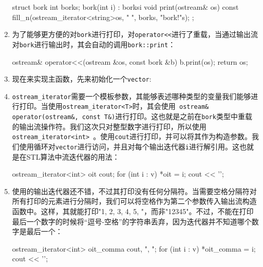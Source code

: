 \begin{enumerate}
\begin{codebox}[cpp]
struct bork {
    int borks;
    bork(int i) : borks{i} {}
    void print(ostream& os) const {
        fill_n(ostream_iterator<string>{os, " "},
               borks, "bork!"s);
    }
};
\end{codebox}

\item 为了能够更方便的对\texttt{bork}进行打印，对\texttt{operator<<}进行了重载，当通过输出流对\texttt{bork}进行输出时，其会自动的调用\texttt{bork::print}：

\begin{codebox}[cpp]
ostream& operator<<(ostream &os, const bork &b) {
    b.print(os);
    return os;
}
\end{codebox}

\item 现在来实现主函数，先来初始化一个\texttt{vector}:

\begin{codebox}[cpp]
int main()
{
    const vector<int> v {1, 2, 3, 4, 5};
\end{codebox}

\item \texttt{ostream\_iterator}需要一个模板参数，其能够表述哪种类型的变量我们能够进行打印。当使用\texttt{ostream\_iterator<T>}时，其会使用\texttt{ ostream\& operator(ostream\&, const T\&)}进行打印。这也就是之前在\texttt{bork}类型中重载的输出流操作符。我们这次只对整型数字进行打印，所以使用\texttt{ostream\_iterator<int> }。使用\texttt{cout}进行打印，并可以将其作为构造参数。我们使用循环对\texttt{vector}进行访问，并且对每个输出迭代器\texttt{i}进行解引用。这也就是在STL算法中流迭代器的用法：

\begin{codebox}[cpp]
    ostream_iterator<int> oit {cout};
    for (int i : v) { *oit = i; }
    cout << '\n';
\end{codebox}

\item 使用的输出迭代器还不错，不过其打印没有任何分隔符。当需要空格分隔符对所有打印的元素进行分隔时，我们可以将空格作为第二个参数传入输出流构造函数中。这样，其就能打印"1, 2, 3, 4, 5, "，而非"12345"。不过，不能在打印最后一个数字的时候将“逗号-空格”的字符串丢弃，因为迭代器并不知道哪个数字是最后一个：

\begin{codebox}[cpp]
    ostream_iterator<int> oit_comma {cout, ", "};
    for (int i : v) { *oit_comma = i; }
    cout << '\n';
\end{codebox}


\end{enumerate}

